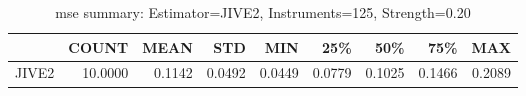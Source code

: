 \begin{table}[ht]
\centering
\caption{mse summary: Estimator=JIVE2, Instruments=125, Strength=0.20}
\begin{tabular}{lrrrrrrrr}
\toprule
 & COUNT & MEAN & STD & MIN & 25\% & 50\% & 75\% & MAX \\
\midrule
JIVE2 & 10.0000 & 0.1142 & 0.0492 & 0.0449 & 0.0779 & 0.1025 & 0.1466 & 0.2089 \\
\bottomrule
\end{tabular}
\end{table}
